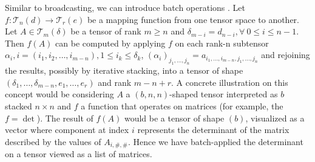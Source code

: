 Similar to broadcasting, we can introduce batch operations \cite{Numpy}. Let $f:\mathcal{T}_n(d)\rightarrow\mathcal{T}_r(e)$ be a mapping function from one tensor space to another. Let $A\in\mathcal{T}_m({\delta})$ be a tensor of rank $m \geq n$ and $\delta_{m-i} = d_{n-i}, \forall \ 0\leq i \leq n-1$. Then $f(A)$ can be computed by applying $f$ on each rank-{n} subtensor $\alpha_i, i=(i_1,i_2,\ldots,i_{m-n}), 1\leq i_k \leq \delta_{k}$, $(\alpha_i)_{j_1,\ldots,j_n} = a_{i_1,\ldots,i_{m-n}, j_1,\ldots,j_n}$ and rejoining the results, possibly by iterative stacking, into a tensor of shape $(\delta_1,\ldots,\delta_{m-n},e_1,\ldots,e_r)$ and rank $m-n+r$. A concrete illustration on this concept would be considering $A$ a $(b,n,n)$-shaped tensor interpreted as $b$ stacked $n \times n$ and $f$ a function that operates on matrices (for example, the $f=\det$). The result of $f(A)$ would be a tensor of shape $(b)$, visualized as a vector where component at index $i$ represents the determinant of the matrix described by the values of $A_{i,\#,\#}$. Hence we have batch-applied the determinant on a tensor viewed as a list of matrices.